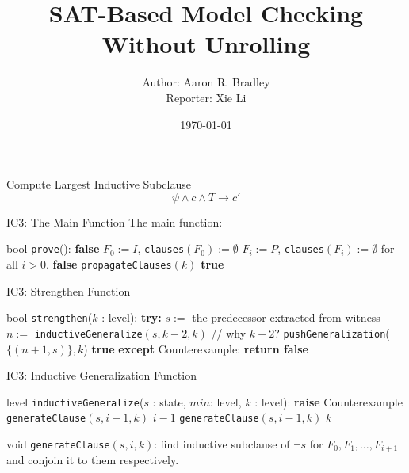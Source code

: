 \documentclass[aspectratio=1610, 13pt]{beamer}
\title{SAT-Based Model Checking Without Unrolling}
\author{Author: Aaron R. Bradley\\
Reporter:  Xie Li}
\date{\today}
\begin{document}
\maketitle

\begin{frame}{Compute Largest Inductive Subclause}
\[\psi \wedge c \wedge T \rightarrow c'\]
\vspace{5em}
\end{frame}

\begin{frame}{IC3: The Main Function}
The main function:
\begin{algorithmic}[1]
\STATE bool \texttt{prove}():
	\RETURN \textbf{false}
	\ENDIF
	\STATE $F_0 := I$, \texttt{clauses}$(F_0) := \emptyset$
	\STATE $F_i := P$, \texttt{clauses}$(F_i) := \emptyset$ for all $i > 0$.
	\RETURN  \textbf{false}
	\ENDIF
	\STATE \texttt{propagateClauses}$(k)$
	\RETURN \textbf{true}
	\ENDIF
	\ENDFOR
\end{algorithmic}
\end{frame}

\begin{frame}{IC3: Strengthen Function}

\begin{algorithmic}[1]
\STATE bool \texttt{strengthen}($k$ : level):
\STATE \textbf{try:}
		\STATE $s:=$ the predecessor extracted from witness
		\STATE $n := $ \texttt{inductiveGeneralize}$ (s, k-2, k)$ // why $k - 2$?
		\STATE \texttt{pushGeneralization}($\{(n + 1, s)\}, k$)
	\ENDWHILE
		\RETURN \textbf{true}
\STATE \textbf{except} Counterexample:\textbf{ return false}
\end{algorithmic}
\end{frame}

\begin{frame}{IC3: Inductive Generalization Function}

\begin{algorithmic}[1]
\STATE level \texttt{inductiveGeneralize}($s$ : state, $min$: level, $k$ : level):
\STATE \textbf{raise} Counterexample
\ENDIF
{}
\STATE \texttt{generateClause}$(s, i-1, k)$
\RETURN $i - 1$
\ENDIF
\ENDFOR
\STATE \texttt{generateClause}$(s, i-1, k)$
\RETURN $k$
\end{algorithmic}
\begin{algorithmic}[1]
\STATE void \texttt{generateClause}$(s, i, k)$: find inductive subclause of $\neg s$ for $F_0, F_1, \ldots, F_{i + 1}$ and conjoin it to them respectively.
\end{algorithmic}
\end{frame}
\end{document}

